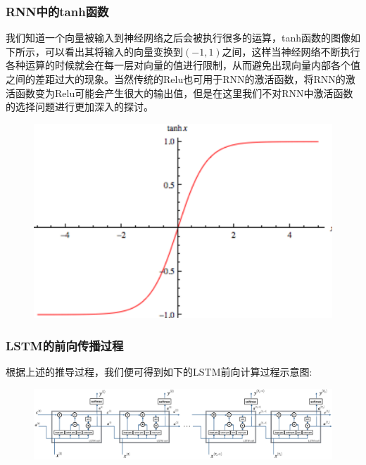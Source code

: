 \documentclass{ctexart}
\begin{document}
\subsubsection{RNN中的tanh函数}
我们知道一个向量被输入到神经网络之后会被执行很多的运算，tanh函数的图像如下所示，可以看出其将输入的向量变换到$(-1,1)$之间，这样当神经网络不断执行各种运算的时候就会在每一层对向量的值进行限制，从而避免出现向量内部各个值之间的差距过大的现象。当然传统的Relu也可用于RNN的激活函数，将RNN的激活函数变为Relu可能会产生很大的输出值，但是在这里我们不对RNN中激活函数的选择问题进行更加深入的探讨。
\begin{figure}[htb!]
	\centering
	\includegraphics[scale=0.2]{tanh.png}
\end{figure}
\subsubsection{LSTM的前向传播过程}
根据上述的推导过程，我们便可得到如下的LSTM前向计算过程示意图:
\begin{figure}[htb!]
	\centering
	\includegraphics[scale=0.55]{LSTM_rnn.png}
\end{figure}
\end{document}
